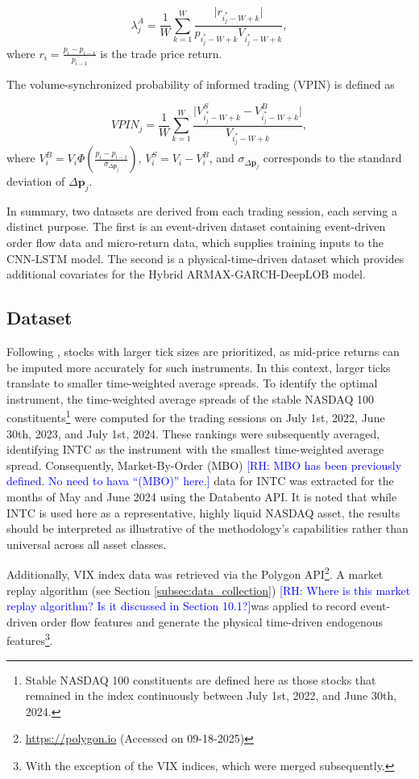 \documentclass[10pt,a4paper,oneside]{article}
\newcommand{\rh}[1]{\textcolor{blue}{\textsf{[RH: #1]}}}
\begin{document}
\[
    \lambda^A_j = \frac{1}{W} \sum_{k=1}^W \frac{\big| r_{i^*_j - W + k} \big|}{p_{i^*_j - W + k} V_{i^*_j - W + k}},
\]
where \(r_i = \frac{p_i - p_{i-1}}{p_{i-1}}\) is the trade price return.

The volume-synchronized probability of informed trading (VPIN) is defined as

\[
    VPIN_j = \frac{1}{W} \sum_{k=1}^W \frac{\big| V_{i^*_j - W + k}^S - V_{i^*_j - W + k}^B \big|}{V_{i^*_j - W + k}},
\]
where \(V^B_i = V_i \Phi \left( \frac{p_i - p_{i-1}}{\sigma_{\Delta \mathbf{p}_j}} \right)\), \(V^S_i = V_i - V^B_i\), and \(\sigma_{\Delta \mathbf{p}_j}\) corresponds to the standard deviation of \(\Delta \mathbf{p}_j\).

In summary, two datasets are derived from each trading session, each serving a distinct purpose. The first is an event-driven dataset containing event-driven order flow data and micro-return data, which supplies training inputs to the CNN-LSTM model. The second is a physical-time-driven dataset which provides additional covariates for the Hybrid ARMAX-GARCH-DeepLOB model.

\subsection{Dataset}
\label{subsec:dataset}

Following \cite{briola2024deep}, stocks with larger tick sizes are prioritized, as mid-price returns can be imputed more accurately for such instruments. In this context, larger ticks translate to smaller time-weighted average spreads. To identify the optimal instrument, the time-weighted average spreads of the stable NASDAQ 100 constituents\footnote{Stable NASDAQ 100 constituents are defined here as those stocks that remained in the index continuously between July 1st, 2022, and June 30th, 2024.} were computed for the trading sessions on July 1st, 2022, June 30th, 2023, and July 1st, 2024. These rankings were subsequently averaged, identifying INTC as the instrument with the smallest time-weighted average spread. Consequently, Market-By-Order (MBO) \rh{MBO has been previously defined. No need to hava ``(MBO)'' here.} data for INTC was extracted for the months of May and June 2024 using the Databento API. It is noted that while INTC is used here as a representative, highly liquid NASDAQ asset, the results should be interpreted as illustrative of the methodology's capabilities rather than universal across all asset classes.

Additionally, VIX index data was retrieved via the Polygon API\footnote{\url{https://polygon.io} (Accessed on 09-18-2025)}. A market replay algorithm (see Section \ref{subsec:data_collection}) \rh{Where is this market replay algorithm? Is it discussed in Section 10.1?}was applied to record event-driven order flow features and generate the physical time-driven endogenous features\footnote{With the exception of the VIX indices, which were merged subsequently.}.
\end{document}
